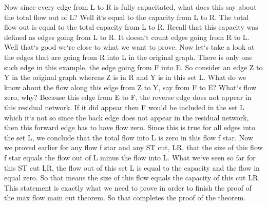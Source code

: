 Now since every edge from L to R is fully capacitated, what does this say about the total flow out of L? Well it`s equal to the capacity from L to R\@.
The total flow out is equal to the total capacity from L to R\@.
Recall that this capacity was defined as edges going from L to R\@.
It doesn`t count edges going from R to L\@.
Well that`s good we`re close to what we want to prove.
Now let`s take a look at the edges that are going from R into L in the original graph.
There is only one such edge in this example, the edge going from F into E\@.
So consider an edge Z to Y in the original graph whereas Z is in R and Y is in this set L\@.
What do we know about the flow along this edge from Z to Y, say from F to E? What`s flow zero, why? Because this edge from E to F, the reverse edge does not appear in this residual network.
If it did appear then F would be included in the set L which it`s not so since the back edge does not appear in the residual network, then this forward edge has to have flow zero.
Since this is true for all edges into the set L, we conclude that the total flow into L is zero in this flow f star.
Now we proved earlier for any flow f star and any ST cut, LR, that the size of this flow f star equals the flow out of L minus the flow into L\@.
What we`ve seen so far for this ST cut LR, the flow out of this set L is equal to the capacity and the flow in equal zero.
So that means the size of this flow equals the capacity of this cut LR\@.
This statement is exactly what we need to prove in order to finish the proof of the max flow main cut theorem.
So that completes the proof of the theorem.

